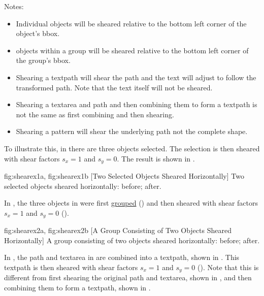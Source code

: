 Notes:
\begin{itemize}
\item Individual \glspl*{object}
will be sheared relative to the bottom left corner of the
object's \gls{bbox}.

\item \Glspl*{object} within a 
\gls{group} will be sheared relative to the bottom
left corner of the group's \gls*{bbox}.

\item Shearing a \gls{textpath} will shear the path and the text
will adjust to follow the transformed path. Note that the text
itself will not be sheared.

\item Shearing a \gls*{textarea} and \gls*{path} and then combining
them to form a \gls*{textpath} is not the same as first combining
and then shearing. 

\item Shearing a \gls{pattern} will shear the underlying path not
the complete shape.
\end{itemize}

To illustrate this, in  there are three
\glspl*{object} selected.  The selection is then sheared with shear
factors $s_x=1$ and $s_y=0$.  The result is shown in
.

{
 {fig:shearex1a}{}{},
 {fig:shearex1b}{}{}
}
[Two Selected Objects Sheared Horizontally]
{Two selected objects sheared horizontally:
 before;
 after.}

In , the three objects in
 were first \hyperref[sec:grouping]{grouped}
() and then sheared with shear factors
$s_x=1$ and $s_y=0$ ().

{
 {fig:shearex2a}{}{},
 {fig:shearex2b}{}{}
}
[A Group Consisting of Two Objects Sheared Horizontally]
{A group consisting of two objects sheared horizontally:
 before;
 after.}

In , the \gls*{path} and
\gls*{textarea} in  are combined into
a \gls*{textpath}, shown in . This
\gls*{textpath} is then sheared with shear factors $s_x=1$ and
$s_y=0$ (). Note that this is
different from first shearing the original \gls*{path} and
\gls*{textarea}, shown in , and then
combining them to form a \gls*{textpath}, shown in
.

